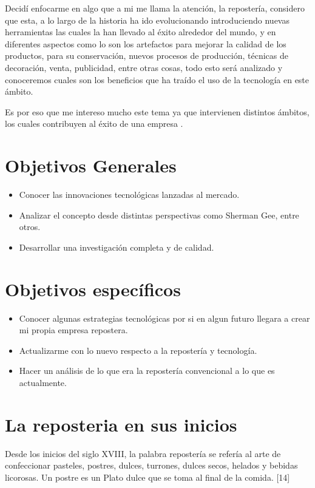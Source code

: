 \documentclass{bmcart}
\begin{document}
Decidí enfocarme en algo que a mi me llama la atención, la repostería, considero que esta, a lo largo de la historia ha ido evolucionando introduciendo nuevas herramientas las cuales la han llevado al éxito alrededor del mundo, y en diferentes aspectos como lo son los artefactos para mejorar la calidad de los productos, para su conservación, nuevos procesos de producción, técnicas de decoración, venta, publicidad, entre otras cosas, todo esto será analizado y conoceremos cuales son los beneficios que ha traído el uso de la tecnología en este ámbito.


Es por eso que me intereso mucho este tema ya que intervienen distintos ámbitos, los cuales contribuyen al éxito de una empresa .


\section{Objetivos Generales}
	\begin{itemize}
\item Conocer las innovaciones tecnológicas lanzadas al mercado.
\item Analizar el concepto desde distintas perspectivas como Sherman Gee, entre otros.
\item Desarrollar una investigación completa y de calidad.

	\end{itemize}
		
\section{Objetivos específicos}
\begin{itemize}
\item Conocer algunas estrategias tecnológicas por si en algun futuro llegara a crear mi propia empresa repostera.
\item Actualizarme con lo nuevo respecto a la repostería y tecnología.
\item Hacer un análisis de lo que era la repostería convencional a lo que es actualmente.

	\end{itemize}

\newpage

\section{La reposteria en sus inicios}
Desde los inicios del siglo XVIII, la palabra repostería se refería al arte de confeccionar pasteles, postres, dulces, turrones, dulces secos, helados y bebidas licorosas. Un postre es un Plato dulce que se toma al final de la comida. [14]
\end{document}
